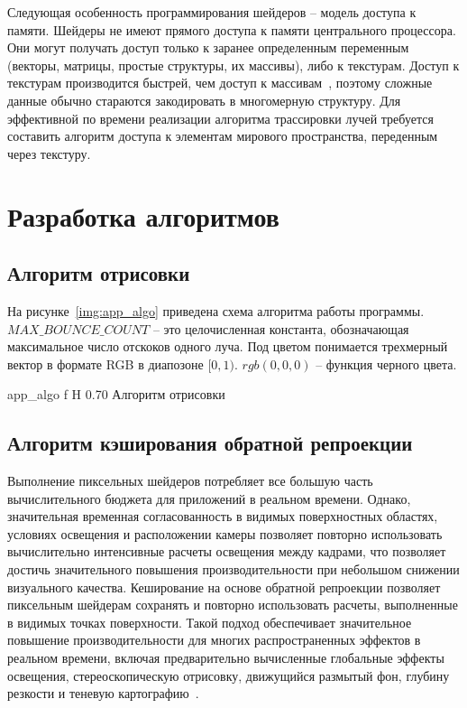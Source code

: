 Следующая особенность программирования шейдеров -- модель доступа к памяти. 
Шейдеры не имеют прямого доступа к памяти центрального процессора. Они могут
получать доступ только к заранее определенным переменным (векторы, матрицы,
простые структуры, их массивы), либо к текстурам. Доступ к текстурам производится
быстрей, чем доступ к массивам~\cite{VulkanTut}, поэтому сложные данные обычно стараются 
закодировать в многомерную структуру. Для эффективной по времени реализации
алгоритма трассировки лучей требуется составить алгоритм доступа к элементам
мирового пространства, переденным через текстуру. 

\section{Разработка алгоритмов}

\subsection{Алгоритм отрисовки}

На рисунке~\ref{img:app_algo} приведена схема алгоритма работы программы.
$MAX\_BOUNCE\_COUNT$ -- это целочисленная константа, обозначающая максимальное число
отскоков одного луча. Под цветом понимается
трехмерный вектор в формате RGB в диапозоне $[0, 1)$. $rgb(0,0,0)$ -- функция черного цвета. 

    {app_algo}
    {f}
    {H}
    {0.70\textwidth}
    {Алгоритм отрисовки}

\subsection{Алгоритм кэширования обратной репроекции}
Выполнение пиксельных шейдеров потребляет все большую часть вычислительного бюджета для приложений в 
реальном времени. Однако, значительная временная согласованность в видимых поверхностных областях, 
условиях освещения и расположении камеры позволяет повторно использовать вычислительно интенсивные 
расчеты освещения между кадрами, что позволяет достичь значительного повышения производительности 
при небольшом снижении визуального качества. 
Кеширование на основе обратной репроекции позволяет пиксельным шейдерам сохранять и повторно использовать 
расчеты, выполненные в видимых точках поверхности. 
Такой подход обеспечивает значительное повышение производительности для многих распространенных 
эффектов в реальном времени, включая предварительно вычисленные глобальные эффекты освещения, 
стереоскопическую отрисовку, движущийся размытый фон, глубину резкости и теневую картографию~\cite{ARTSwRPC}.

